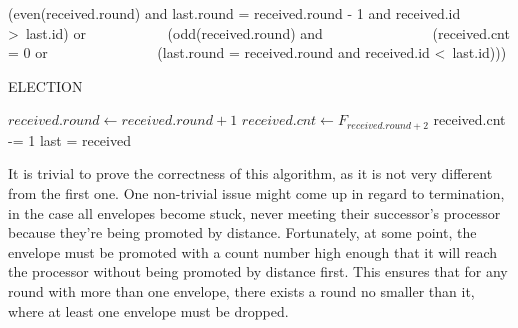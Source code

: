 \documentclass{article}
\begin{document}
\begin{algorithmic}
        \State \Return (even(received.round) and last.round = received.round - 1 and received.id \textgreater \ last.id) or
        \State \ \ \ \ \ \ \ \ \ \ \ (odd(received.round) and 
        \State \ \ \ \ \ \ \ \ \ \ \ \ \ \ \  (received.cnt = 0 or 
        \State \ \ \ \ \ \ \ \ \ \ \ \ \ \ \  (last.round = received.round and received.id \textless \ last.id)))
    \EndFunction

\begin{algorithm}[H]
\caption{ELECTION}
\Repeat
            \State $received.round \gets received.round + 1$
            \State $received.cnt \gets F_{received.round+2}$
        \EndIf
        \State received.cnt -= 1
        \State last = received
        \State {}
    \EndIf
\Until {}

\end{algorithm}
\end{algorithmic}

It is trivial to prove the correctness of this algorithm, as it is not very different from the first one. One non-trivial issue might come up in regard to termination, in the case all envelopes become stuck, never meeting their successor's processor because they're being promoted by distance. Fortunately, at some point, the envelope must be promoted with a count number high enough that it will reach the processor without being promoted by distance first. This ensures that for any round with more than one envelope, there exists a round no smaller than it, where at least one envelope must be dropped.
\\
\end{document}
